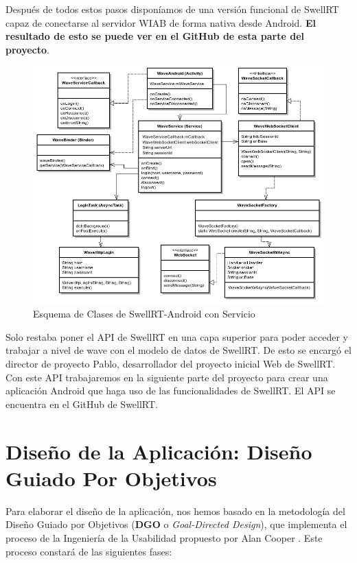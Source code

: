     Después de todos estos pasos disponíamos de una versión funcional de SwellRT capaz de conectarse al servidor WIAB de forma nativa desde Android. \textbf{El resultado de esto se puede ver en el GitHub de esta parte del proyecto}\cite{ref:wave_migration_github}.
    
  \begin{figure}[!]
   \centering
	\includegraphics[keepaspectratio, scale=0.5]{Media/Diagrams/waveServiceClassDiagram.png}
    \caption{Esquema de Clases de SwellRT-Android con Servicio}
   \label{fig:sequenceDiagram_waveWebSocket}
  \end{figure}
    
    Solo restaba poner el API de SwellRT en una capa superior para poder acceder y trabajar a nivel de wave con el modelo de datos de SwellRT. De esto se encargó el director de proyecto Pablo, desarrollador del proyecto inicial Web de SwellRT. Con este API trabajaremos en la siguiente parte del proyecto para crear una aplicación Android que haga uso de las funcionalidades de SwellRT. El API se encuentra en el GitHub de SwellRT.

\section{Diseño de la Aplicación: Diseño Guiado Por Objetivos}

Para elaborar el diseño de la aplicación, nos hemos basado en la metodología del Diseño Guiado por Objetivos (\textbf{DGO} o \textit{Goal-Directed Design}), que implementa el proceso de la Ingeniería de la Usabilidad propuesto por Alan Cooper \cite{ref:bookAlanCooper}. Este proceso constará de las siguientes fases:

